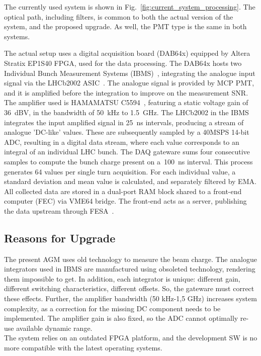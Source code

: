 The currently used system is shown in Fig.~\ref{fig:current_system_processing}.
%
The optical path, including filters, is common to both the actual version of the system, and the proposed upgrade. As well, the PMT type is the same in both systems.

The actual setup uses a digital acquisition board (DAB64x) equipped by Altera Stratix EP1S40 FPGA, used for the data processing.
%
The DAB64x hosts two Individual Bunch Measurement Systems (IBMS)~\cite{ibms}, integrating the analogue input signal via the LHCb2002 ASIC~\cite{lhcb_asic}.
%
The analogue signal is provided by MCP PMT, and it is amplified before the integration to improve on the measurement SNR.
%
The amplifier used is HAMAMATSU C5594~\cite{bsra_first_operation}, featuring a static voltage gain of \SI{36}{dBV}, in the bandwidth of \SI{50}{kHz} to \SI{1.5}{GHz}.
%
The LHCb2002 in the IBMS integrates the input amplified signal in \SI{25}{\nano\second} intervals, producing a stream of analogue 'DC-like' values.
%
These are subsequently sampled by a 40MSPS 14-bit ADC, resulting in a digital data stream, where each value corresponds to an integral of an individual LHC bunch.
%
The DAQ gateware sums four consecutive samples to compute the
bunch charge present on a~\SI{100}{ns} interval.
%
This process generates 64 values per single turn acquisition.
%
For each individual value, a standard deviation and mean value is calculated, and separately filtered by EMA. 
%
All collected data are stored in a dual-port RAM block shared to a front-end computer (FEC) via VME64 bridge.
%
The front-end acts as a server, publishing the data upstream through FESA~\cite{fesa}.

\subsection{Reasons for Upgrade}
The present AGM uses old technology to measure the beam charge. 
%
The analogue integrators used in IBMS are manufactured using obsoleted technology, rendering them impossible to get.
%
In addition, each integrator is unique: different gain, different switching characteristics, different offsets. 
%
So, the gateware must correct these effects.
%
Further, the amplifier bandwidth (50 kHz-1,5 GHz) increases system complexity, as a correction for the missing DC component needs to be implemented.
%
The amplifier gain is also fixed, so the ADC cannot optimally re-use available dynamic range.
\\
The system relies on an outdated FPGA platform, and the development SW is no more compatible with the latest operating systems. 


